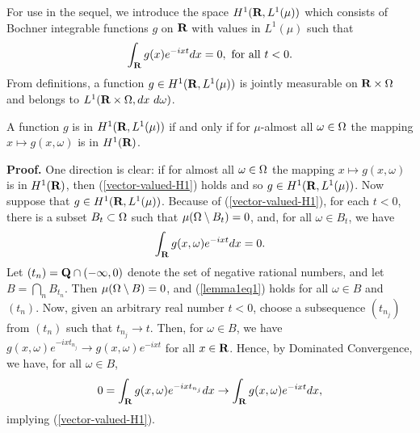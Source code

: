 For use in the sequel, we introduce
the space $H^1(\R,L^1(\mu))$
which consists of Bochner integrable functions 
$g$ on $\R$
with values in $L^1(\mu)$ such that
\begin{equation}
\int_\R g(x) e^{-ixt} dx=0,\ {\rm for\ all}\ t<0.
\label{vector-valued-H1}
\end{equation}
From definitions, a function $g\in H^1(\R, L^1(\mu))$
is jointly measurable on $\R\times\O$ and 
belongs to $L^1(\R\times \O,dx\ d\omega)$.
\begin{lemma1}
A 
function $g$ 
is in $H^1(\R,L^1(\mu))$ if and only if
for $\mu$-almost all 
$\omega\in \Omega$ the mapping $x\mapsto g(x,\omega)$
is in $H^1(\R)$.
\label{lemma1}
\end{lemma1}
{\bf Proof.}  One direction is clear:  if
for almost all $\omega\in \Omega$ the mapping $x\mapsto g(x,\omega)$
is in $H^1(\R)$, then 
(\ref{vector-valued-H1}) holds and so $g\in H^1(\R,L^1(\mu))$.
Now suppose that $g\in H^1(\R,L^1(\mu))$.  Because of
(\ref{vector-valued-H1}), for each $t<0$, there is a subset
$B_t\subset \Omega$ such that $\mu(\Omega\setminus B_t)=0$, and,
for all $\omega\in B_t$, we have
\begin{equation}
\int_\R g(x,\omega)e^{-ixt}dx=0.
\label{lemma1eq1}
\end{equation}
Let $(t_n)=\Q\cap (-\infty,0)$
denote the set of negative rational numbers, and let 
$B=\bigcap_nB_{t_n}$.
Then $\mu(\Omega\setminus B)=0$, and (\ref{lemma1eq1})
holds for all
$\omega\in B$ and $(t_n)$.  
Now, given an arbitrary 
real number $t< 0$, choose a subsequence
$(t_{n_j})$ from $(t_n)$ such that
$t_{n_j}\rightarrow t$.
Then, for $\omega\in B$, we have
$g(x,\omega)e^{-ixt_{n_j}}\rightarrow  g(x,\omega)e^{-ixt}$
for all $x\in \R$.
Hence, by Dominated Convergence, we have,
for all $\omega\in B$, 
$$0=\int_\R g(x,\omega)e^{-ixt_{n_j}}dx\rightarrow 
\int_\R g(x,\omega)e^{-ixt}dx,$$
implying (\ref{vector-valued-H1}).
 
